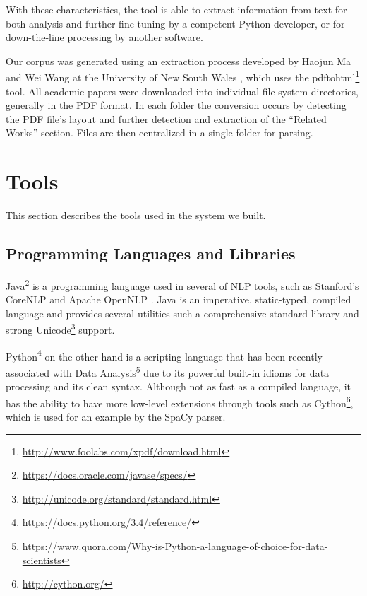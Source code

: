 \documentclass[11pt,a4paper,openright]{memoir}
\begin{document}
With these characteristics, the tool is able to extract information from text for both analysis and further fine-tuning by a competent Python developer, or for down-the-line processing by another software.

Our corpus was generated using an extraction process developed by Haojun Ma and Wei Wang at the University of New South Wales \cite{pdf-extraction}, which uses the pdftohtml\footnote{\url{http://www.foolabs.com/xpdf/download.html}} tool. All academic papers were downloaded into individual file-system directories, generally in the PDF \cite{pdf} format. In each folder the conversion occurs by detecting the PDF file's layout and further detection and extraction of the \enquote{Related Works} section. Files are then centralized in a single folder for parsing.


%
%
%
%


\section{Tools}
\label{section:tools}

This section describes the tools used in the system we built.

\subsection{Programming Languages and Libraries}

Java\footnote{\url{https://docs.oracle.com/javase/specs/}} is a programming language used in several of NLP tools, such as Stanford's CoreNLP \cite{manning-EtAl:2014:P14-5} and Apache OpenNLP \cite{open-nlp}. Java is an imperative, static-typed, compiled language and provides several utilities such a comprehensive standard library and strong Unicode\footnote{\url{http://unicode.org/standard/standard.html}} support. 

Python\footnote{\url{https://docs.python.org/3.4/reference/}} on the other hand is a scripting language that has been recently associated with Data Analysis\footnote{\url{https://www.quora.com/Why-is-Python-a-language-of-choice-for-data-scientists}} due to its powerful built-in idioms for data processing and its clean syntax. Although not as fast as a compiled language, it has the ability to have more low-level extensions through tools such as Cython\footnote{\url{http://cython.org/}}, which is used for an example by the SpaCy \cite{honnibal-johnson:2015:EMNLP, spacy} parser.
\end{document}

